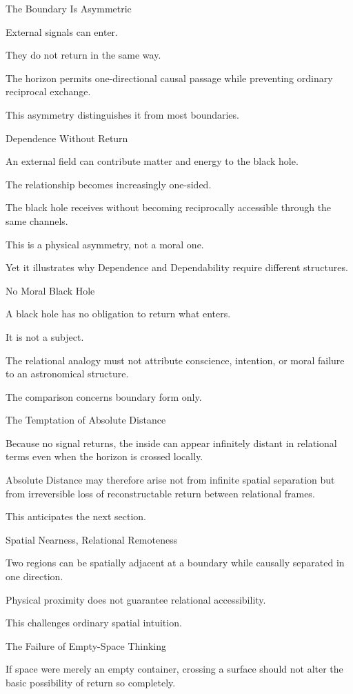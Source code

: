 The Boundary Is Asymmetric

External signals can enter.

They do not return in the same way.

The horizon permits one-directional causal passage while preventing ordinary reciprocal exchange.

This asymmetry distinguishes it from most boundaries.

Dependence Without Return

An external field can contribute matter and energy to the black hole.

The relationship becomes increasingly one-sided.

The black hole receives without becoming reciprocally accessible through the same channels.

This is a physical asymmetry, not a moral one.

Yet it illustrates why Dependence and Dependability require different structures.

No Moral Black Hole

A black hole has no obligation to return what enters.

It is not a subject.

The relational analogy must not attribute conscience, intention, or moral failure to an astronomical structure.

The comparison concerns boundary form only.

The Temptation of Absolute Distance

Because no signal returns, the inside can appear infinitely distant in relational terms even when the horizon is crossed locally.

Absolute Distance may therefore arise not from infinite spatial separation but from irreversible loss of reconstructable return between relational frames.

This anticipates the next section.

Spatial Nearness, Relational Remoteness

Two regions can be spatially adjacent at a boundary while causally separated in one direction.

Physical proximity does not guarantee relational accessibility.

This challenges ordinary spatial intuition.

The Failure of Empty-Space Thinking

If space were merely an empty container, crossing a surface should not alter the basic possibility of return so completely.

